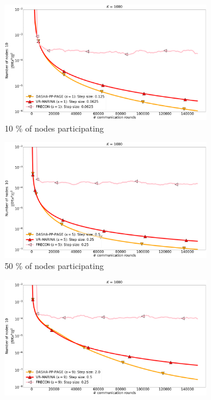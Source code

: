 \documentclass[10pt]{article}
\begin{document}
\vspace{-0.5cm}
\begin{figure}[H]
    \begin{subfigure}{.33\textwidth}
        \includegraphics[width=\textwidth]{neurips_2022_finite_sum_mnist_nof_1000_numnodes_10_more_probs_batch_size_100_split_by_labels_logistic_frecon_number_of_workers_1.pdf}
        \caption{10 \% of nodes participating}
    \end{subfigure}
    \begin{subfigure}{.33\textwidth}
        \includegraphics[width=\textwidth]{neurips_2022_finite_sum_mnist_nof_1000_numnodes_10_more_probs_batch_size_100_split_by_labels_logistic_frecon_number_of_workers_5.pdf}
        \caption{50 \% of nodes participating}
    \end{subfigure}
    \begin{subfigure}{.33\textwidth}
        \includegraphics[width=\textwidth]{neurips_2022_finite_sum_mnist_nof_1000_numnodes_10_more_probs_batch_size_100_split_by_labels_logistic_frecon_number_of_workers_9.pdf}

\end{subfigure}
\end{figure}
\end{document}
